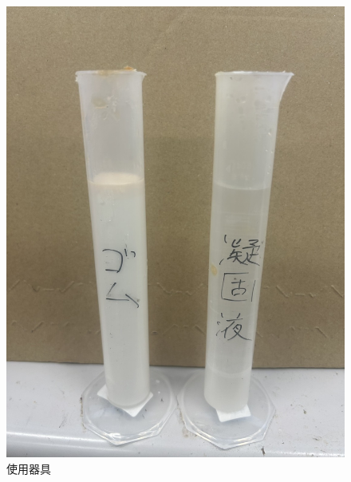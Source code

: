 \begin{figure}
\begin{minipage}[b]{0.19\hsize}
  \end{minipage}
  \begin{minipage}[b]{0.19\hsize}
    \centering
    \includegraphics[scale=0.05]{pic/eki.jpg}
  
  \end{minipage}
  \caption{使用器具}
  \label{fig:3}
  \end{figure}

